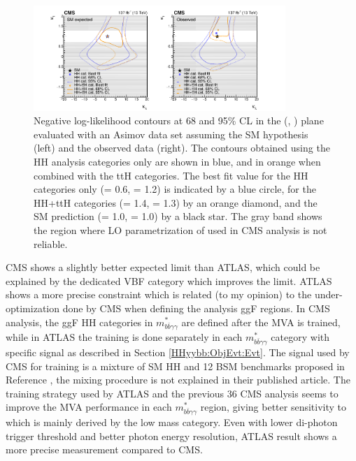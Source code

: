 \begin{figure}[htbp]
    \centering
    \includegraphics[width=0.85\textwidth]{Ch5/Img/CMS-HIG-19-018_kl_LH.pdf}
    \caption{Negative log-likelihood contours at 68 and 95\% CL in the (\kl, \kt) plane evaluated with an Asimov data set assuming the SM hypothesis (left) and the observed data (right). The contours obtained using the HH analysis categories only are shown in blue, and in orange when combined with the ttH categories. The best fit value for the HH categories only (\kl = 0.6, \kt = 1.2) is indicated by a blue circle, for the HH+ttH categories (\kl = 1.4, \kl = 1.3) by an orange diamond, and the SM prediction (\kl = 1.0, \kt = 1.0) by a black star. The gray band shows the region where LO parametrization of \kt used in CMS analysis is not reliable. }
    \label{fig:HHyybb:CMS:LH:2D}
\end{figure}

CMS shows a slightly better expected limit than ATLAS, which could be explained by the dedicated VBF category which improves the limit. ATLAS shows a more precise \kl constraint which is related (to my opinion) to the under-optimization done by CMS when defining the analysis ggF regions. In CMS analysis, the ggF HH categories in $m_{b \bar{b} \gamma \gamma}^{*}$ are defined after the MVA is trained, while in ATLAS the training is done separately in each $m_{b \bar{b} \gamma \gamma}^{*}$ category with specific signal as described in Section \ref{HHyybb:ObjEvt:Evt}. The signal used by CMS for training is a mixture of SM HH and 12 BSM benchmarks proposed in Reference \cite{CMS_BSM}, the mixing procedure is not explained in their published article. The training strategy used by ATLAS and the previous 36 \ifb CMS analysis seems to improve the MVA performance in each $m_{b \bar{b} \gamma \gamma}^{*}$ region, giving better sensitivity to \kl which is mainly derived by the low mass category. Even with lower di-photon trigger threshold and better photon energy resolution, ATLAS result shows a more precise measurement compared to CMS. 

